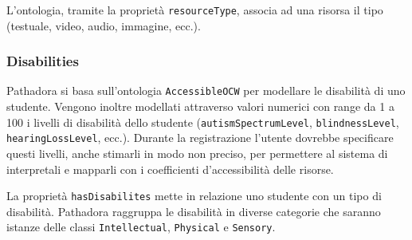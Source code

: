 L'ontologia, tramite la proprietà \texttt{resourceType}, associa ad una risorsa il tipo (testuale, video, audio, immagine, ecc.).

\subsubsection{Disabilities}
Pathadora si basa sull'ontologia \texttt{AccessibleOCW} per modellare le disabilità di uno studente.
Vengono inoltre modellati attraverso valori numerici con range da 1 a 100 i livelli di disabilità dello studente (\texttt{autismSpectrumLevel}, \texttt{blindnessLevel}, \texttt{hearingLossLevel}, ecc.).
Durante la registrazione l'utente dovrebbe specificare questi livelli, anche stimarli in modo non preciso, per permettere al sistema di interpretali e mapparli con i coefficienti d'accessibilità delle risorse.

La proprietà \texttt{hasDisabilites} mette in relazione uno studente con un tipo di disabilità. Pathadora raggruppa le disabilità in diverse categorie che saranno istanze delle classi \texttt{Intellectual}, \texttt{Physical} e \texttt{Sensory}.
